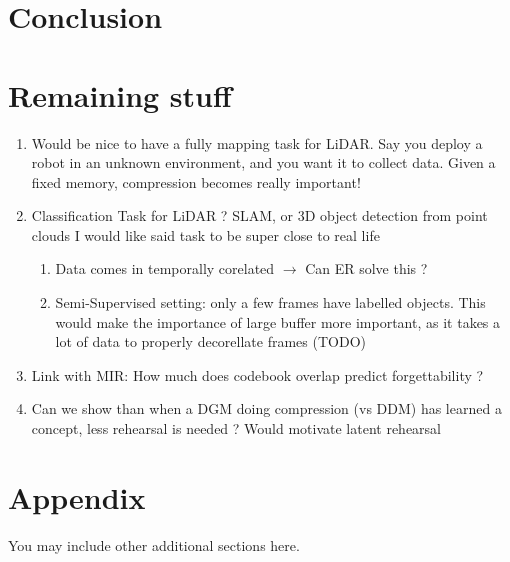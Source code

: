 \documentclass[colorinlistoftodos]{article} %
\begin{document}
\section{Conclusion}

\clearpage
\section{Remaining stuff}

\begin{enumerate}
    \item Would be nice to have a fully mapping task for LiDAR. Say you deploy a robot in an unknown environment, and you want it to collect data. Given a fixed memory, compression becomes really important!

    \item Classification Task for LiDAR ? SLAM, or 3D object detection from point clouds 
    I would like said task to be super close to real life
    \begin{enumerate}
        \item Data comes in temporally corelated $\rightarrow$ Can ER solve this ?
        \item Semi-Supervised setting: only a few frames have labelled objects. This would make the importance of large buffer more important, as it takes a lot of data to properly decorellate frames (TODO)
                
    \end{enumerate}
    
        
    \item Link with MIR: How much does codebook overlap predict forgettability ?
    
    \item Can we show than when a DGM doing compression (vs DDM) has learned a concept, less rehearsal is needed ? Would motivate latent rehearsal

\end{enumerate}






\appendix
\section{Appendix}
You may include other additional sections here. 
\end{document}
